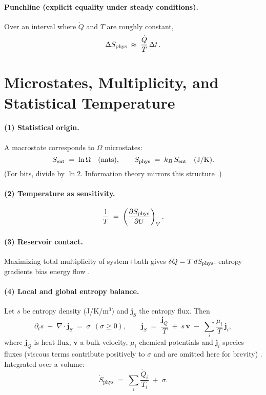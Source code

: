 \documentclass[11pt,oneside]{article}
\begin{document}
\paragraph{Punchline (explicit equality under steady conditions).}
Over an interval where \(\dot Q\) and \(T\) are roughly constant,
\[
\Delta S_{\mathrm{phys}} \;\approx\; \frac{\dot Q}{T}\,\Delta t\,.
\]

\section{Microstates, Multiplicity, and Statistical Temperature}

\paragraph{(1) Statistical origin.}
A macrostate corresponds to \(\Omega\) microstates:
\[
S_{\mathrm{ent}} \;=\; \ln\Omega\quad\text{(nats)},\qquad
S_{\mathrm{phys}} \;=\; k_B\,S_{\mathrm{ent}}\quad\text{(J/K)}.
\]
(For bits, divide by \(\ln 2\). Information theory mirrors this structure \cite{shannon1948mathematical}.)

\paragraph{(2) Temperature as sensitivity.}
\[
\frac{1}{T} \;=\; \left(\frac{\partial S_{\mathrm{phys}}}{\partial U}\right)_V .
\]

\paragraph{(3) Reservoir contact.}
Maximizing total multiplicity of system+\!bath gives \(\delta Q=T\,dS_{\mathrm{phys}}\): entropy gradients bias energy flow \cite{callen1985thermodynamics}.

\paragraph{(4) Local and global entropy balance.}
Let \(s\) be entropy density (J/K/m\(^3\)) and \(\mathbf j_S\) the entropy flux. Then
\[
\partial_t s \;+\; \nabla\!\cdot\!\mathbf j_S \;=\; \sigma\ \ (\sigma\ge 0),
\qquad
\mathbf j_S\;=\;\frac{\mathbf j_Q}{T}\;+\;s\,\mathbf v\;-\;\sum_i \frac{\mu_i}{T}\,\mathbf j_i,
\]
where \(\mathbf j_Q\) is heat flux, \(\mathbf v\) a bulk velocity, \(\mu_i\) chemical potentials and \(\mathbf j_i\) species fluxes (viscous terms contribute positively to \(\sigma\) and are omitted here for brevity) \cite{callen1985thermodynamics}. Integrated over a volume:
\[
\dot{S}_{\mathrm{phys}} \;=\; \sum_i \frac{\dot Q_i}{T_i} \;+\; \sigma.
\]
\end{document}

